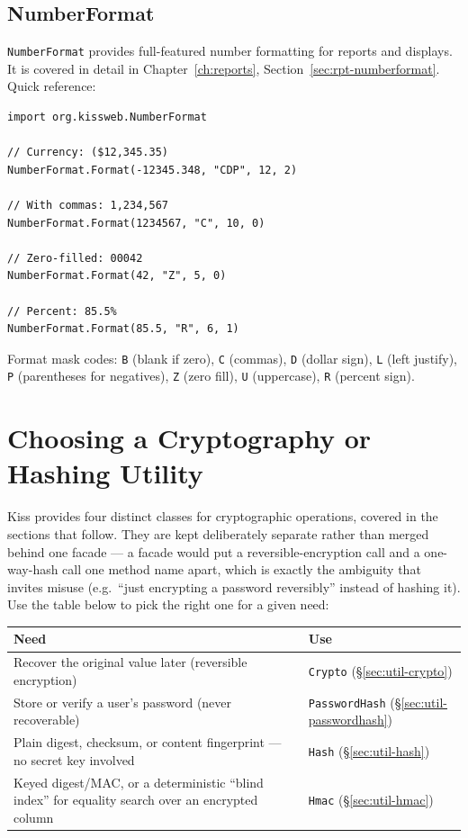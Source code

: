\subsection{NumberFormat}

\texttt{NumberFormat} provides full-featured number formatting for reports and displays.  It is covered in detail in Chapter~\ref{ch:reports}, Section~\ref{sec:rpt-numberformat}.  Quick reference:

\begin{lstlisting}[style=groovy]
import org.kissweb.NumberFormat

// Currency: ($12,345.35)
NumberFormat.Format(-12345.348, "CDP", 12, 2)

// With commas: 1,234,567
NumberFormat.Format(1234567, "C", 10, 0)

// Zero-filled: 00042
NumberFormat.Format(42, "Z", 5, 0)

// Percent: 85.5%
NumberFormat.Format(85.5, "R", 6, 1)
\end{lstlisting}

\noindent
Format mask codes: \texttt{B} (blank if zero), \texttt{C} (commas), \texttt{D} (dollar sign), \texttt{L} (left justify), \texttt{P} (parentheses for negatives), \texttt{Z} (zero fill), \texttt{U} (uppercase), \texttt{R} (percent sign).

\section{Choosing a Cryptography or Hashing Utility}
\label{sec:util-crypto-choice}

Kiss provides four distinct classes for cryptographic operations, covered in the sections that follow.  They are kept deliberately separate rather than merged behind one facade --- a facade would put a reversible-encryption call and a one-way-hash call one method name apart, which is exactly the ambiguity that invites misuse (e.g.\ ``just encrypting a password reversibly'' instead of hashing it).  Use the table below to pick the right one for a given need:

\begin{longtable}{P{4.6cm}P{5.9cm}}
\toprule
\textbf{Need} & \textbf{Use} \\
\midrule
\endhead
Recover the original value later (reversible encryption) & \texttt{Crypto} (\S\ref{sec:util-crypto}) \\
Store or verify a user's password (never recoverable) & \texttt{PasswordHash} (\S\ref{sec:util-passwordhash}) \\
Plain digest, checksum, or content fingerprint --- no secret key involved & \texttt{Hash} (\S\ref{sec:util-hash}) \\
Keyed digest/MAC, or a deterministic ``blind index'' for equality search over an encrypted column & \texttt{Hmac} (\S\ref{sec:util-hmac}) \\
\bottomrule
\end{longtable}

